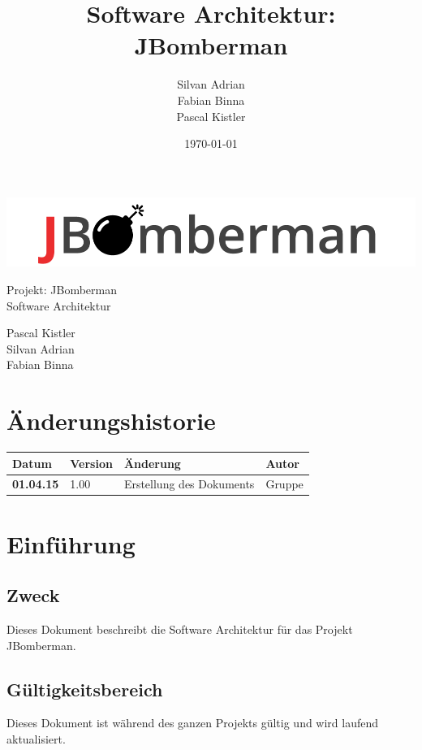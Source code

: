 \documentclass[11pt]{scrartcl}
\title{Software Architektur: JBomberman}
\author{Silvan Adrian \\ Fabian Binna \\ Pascal Kistler}
\date{\today{}}
\begin{document}
\def\arraystretch{1.5}
\begin{titlepage}
\begin{center}
\vspace{10em}
\includegraphics[scale=2]{jbomberman}
\vspace{10em}
\end{center}
\begin{center}
\huge {Projekt: JBomberman} \\
\huge {Software Architektur}
\end{center}
\begin{center}
\vspace{10em}
\LARGE {Pascal Kistler} \\
\LARGE {Silvan Adrian} \\
\LARGE {Fabian Binna}
\end{center}

\end{titlepage}

\newpage
\section{Änderungshistorie}
\label{sec:Änderungen}

\begin{tabularx}{\linewidth}{l l l l}
\textbf{Datum} & \textbf{Version} & \textbf{Änderung}  & \textbf{Autor} \\
\hline
\textbf{01.04.15} & 1.00 & Erstellung des Dokuments & Gruppe \\
\end{tabularx}

\newpage
\tableofcontents
\newpage

\section{Einführung}
\subsection{Zweck}
Dieses Dokument beschreibt die Software Architektur für das Projekt JBomberman.
\subsection{Gültigkeitsbereich}
Dieses Dokument ist während des ganzen Projekts gültig und wird laufend aktualisiert.
\end{document}
